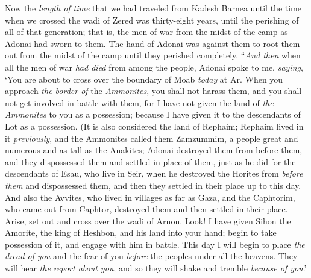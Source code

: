 \begin{biblechapter}
\verse Now the \textit{length of time} that we had traveled from Kadesh Barnea until the time when we crossed the wadi of Zered was thirty-eight years, until the perishing of all of that generation; that is, the men of war from the midst of the camp as Adonai had sworn to them.
\verse The hand of Adonai was against them to root them out from the midst of the camp until they perished completely.
\verse “\textit{And then} when all the men of war \textit{had died} from among the people,
\verse Adonai spoke to me, \textit{saying},
\verse ‘You are about to cross over the boundary of Moab \textit{today} at Ar.
\verse When you approach \textit{the border of} the \textit{Ammonites}, you shall not harass them, and you shall not get involved in battle with them, for I have not given the land of \textit{the Ammonites} to you as a possession; because I have given it to the descendants of Lot as a possession.
\verse (It is also considered the land of Rephaim; Rephaim lived in it \textit{previously}, and the Ammonites called them Zamzummim,
\verse a people great and numerous and as tall as the Anakites; Adonai destroyed them from before them, and they dispossessed them and settled in place of them,
\verse just as he did for the descendants of Esau, who live in Seir, when he destroyed the Horites from \textit{before them} and dispossessed them, and then they settled in their place up to this day.
\verse And also the Avvites, who lived in villages as far as Gaza, and the Caphtorim, who came out from Caphtor, destroyed them and then settled in their place.
\verse Arise, set out and cross over the wadi of Arnon. Look! I have given Sihon the Amorite, the king of Heshbon, and his land into your hand; begin to take possession of it, and engage with him in battle.
\verse This day I will begin to place \textit{the dread of you} and the fear of you \textit{before} the peoples under all the heavens. They will hear \textit{the report about you}, and so they will shake and tremble \textit{because of you}.’ 

\end{biblechapter}
